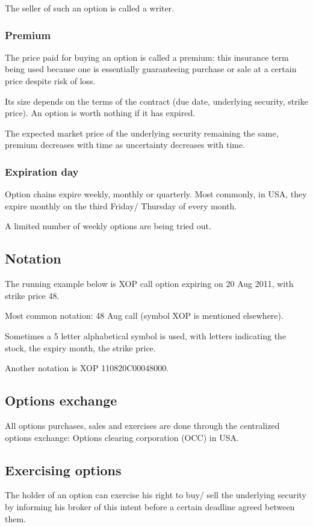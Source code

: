 \documentclass[oneside, article]{memoir}
\begin{document}
The seller of such an option is called a writer.

\subsubsection{Premium}
The price paid for buying an option is called a premium: this insurance term being used because one is essentially guaranteeing purchase or sale at a certain price despite risk of loss.

Its size depends on the terms of the contract (due date, underlying security, strike price). An option is worth nothing if it has expired.

The expected market price of the underlying security remaining the same, premium decreases with time as uncertainty decreases with time.

\subsubsection{Expiration day}
Option chains expire weekly, monthly or quarterly. Most commonly, in USA, they expire monthly on the third Friday/ Thursday of every month.

A limited number of weekly options are being tried out.

\subsection{Notation}
The running example below is XOP call option expiring on 20 Aug 2011, with strike price 48.

Most common notation: 48 Aug call (symbol XOP is mentioned elsewhere).

Sometimes a 5 letter alphabetical symbol is used, with letters indicating the stock, the expiry month, the strike price.

Another notation is XOP   110820C00048000.



\subsection{Options exchange}
All options purchases, sales and exercises are done through the centralized options exchange: Options clearing corporation (OCC) in USA.

\subsection{Exercising options}
The holder of an option can exercise his right to buy/ sell the underlying security by informing his broker of this intent before a certain deadline agreed between them.
\end{document}
